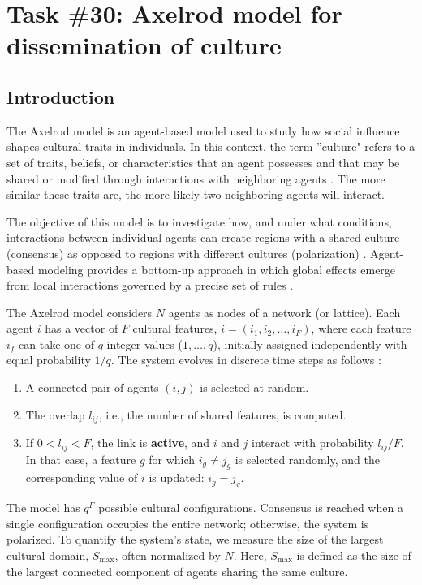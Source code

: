 \chapter{Task \#30: Axelrod model for dissemination of culture}

\section{Introduction}
The Axelrod model is an agent-based model used to study how social influence shapes cultural traits in individuals. In this context, the term ''culture" refers to a set of traits, beliefs, or characteristics that an agent possesses and that may be shared or modified through interactions with neighboring agents \cite{axelrod_introduction}. The more similar these traits are, the more likely two neighboring agents will interact.

The objective of this model is to investigate how, and under what conditions, interactions between individual agents can create regions with a shared culture (consensus) as opposed to regions with different cultures (polarization) \cite{axelrod_algorithm}. Agent-based modeling provides a bottom-up approach in which global effects emerge from local interactions governed by a precise set of rules \cite{axelrod_introduction}.

The Axelrod model considers $N$ agents as nodes of a network (or lattice). Each agent $i$ has a vector of $F$ cultural features, $i = (i_1, i_2, \dots, i_F)$, where each feature $i_f$ can take one of $q$ integer values ($1, \dots, q$), initially assigned independently with equal probability $1/q$. The system evolves in discrete time steps as follows \cite{axelrod_algorithm}:

\begin{enumerate}
    \item A connected pair of agents $(i, j)$ is selected at random.
    \item The overlap $l_{ij}$, i.e., the number of shared features, is computed.
    \item If $0 < l_{ij} < F$, the link is \textbf{active}, and $i$ and $j$ interact with probability $l_{ij}/F$. In that case, a feature $g$ for which $i_g \neq j_g$ is selected randomly, and the corresponding value of $i$ is updated: $i_g = j_g$.
\end{enumerate}

The model has $q^F$ possible cultural configurations. Consensus is reached when a single configuration occupies the entire network; otherwise, the system is polarized. To quantify the system's state, we measure the size of the largest cultural domain, $S_{\max}$, often normalized by $N$. Here, $S_{\max}$ is defined as the size of the largest connected component of agents sharing the same culture.

